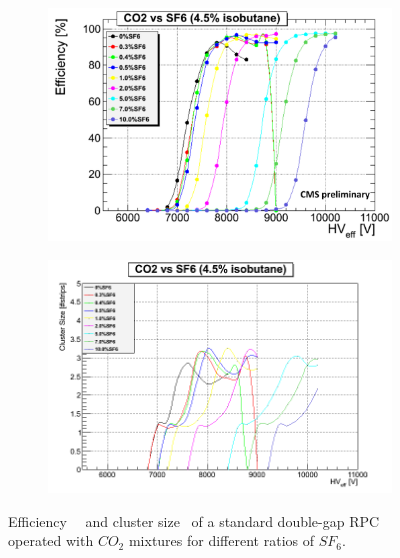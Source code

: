 	\begin{figure}[H]
		\begin{subfigure}{0.5\linewidth}
			\centering
			\includegraphics[width=\linewidth]{fig/chapt4/CO2-UGent.png}
			\caption{\label{fig:UGent-CO2:A}}
		\end{subfigure}
		\begin{subfigure}{0.5\linewidth}
			\centering
			\includegraphics[width=\linewidth]{fig/chapt4/CO2-CS-UGent.png}
			\caption{\label{fig:UGent-CO2:B}}
		\end{subfigure}
		\caption{\label{fig:UGent-CO2} Efficiency~~\cite{PICCOLO2016} and cluster size~ of a standard double-gap RPC operated with $CO_2$ mixtures for different ratios of $SF_6$.}
	\end{figure}

